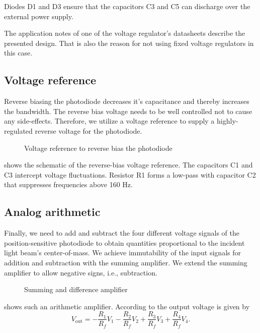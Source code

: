 Diodes D1 and D3 ensure that the capacitors C3 and C5 can discharge over the external power supply.

The application notes of one of the voltage regulator's datasheets describe the presented design.
That is also the reason for not using fixed voltage regulators in this case.

\subsection{Voltage reference}

Reverse biasing the photodiode decreases it's capacitance and thereby increases the bandwidth.
The reverse bias voltage needs to be well controlled not to cause any side-effects.
Therefore, we utilize a voltage reference to supply a highly-regulated reverse voltage for the photodiode.

\begin{figure}[H]
	\centering
	
	\caption{Voltage reference to reverse bias the photodiode}\label{fig:voltage_reference}
\end{figure}

 shows the schematic of the reverse-bias voltage reference.
The capacitors C1 and C3 intercept voltage fluctuations. 
Resistor R1 forms a low-pass with capacitor C2 that suppresses frequencies above 160 Hz.

\subsection{Analog arithmetic}

Finally, we need to add and subtract the four different voltage signals of the position-sensitive photodiode to obtain quantities proportional to the incident light beam's center-of-mass.
We achieve immutability of the input signals for addition and subtraction with the summing amplifier.
We extend the summing amplifier to allow negative signs, i.e., subtraction.

\begin{figure}[H]
	\centering
	
	\caption{Summing and difference amplifier}\label{fig:amplifier_arithmetic}
\end{figure}

 shows such an arithmetic amplifier.
According to \cite[p. 5]{Tietze15} the output voltage is given by
\begin{equation}
	V_\text{out}=-\frac{R_1}{R_f}V_1-\frac{R_2}{R_f}V_2+\frac{R_3}{R_f}V_3+\frac{R_4}{R_f}V_4.
	\label{eq:arithmetic_amplifier_output_voltage}
\end{equation}

